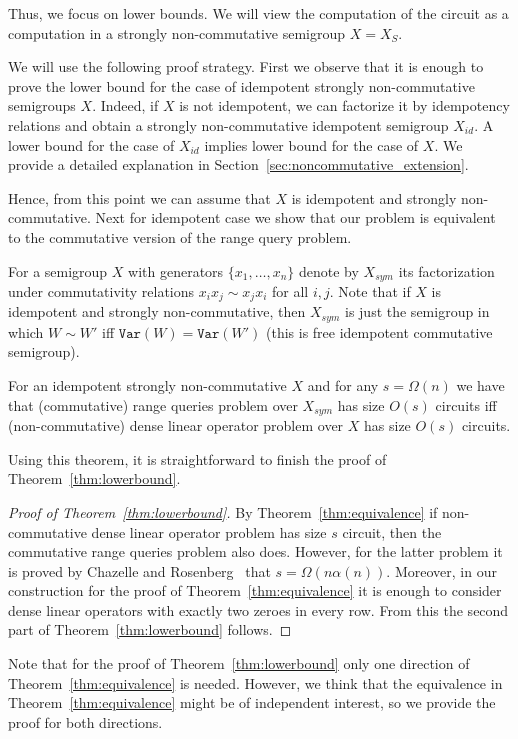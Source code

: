 \documentclass[review,onefignum,onetabnum]{siamart190516}
\newcommand{\var}{\texttt{Var}}
\begin{document}
Thus, we focus on lower bounds. We will view the computation of the circuit as a
computation in a strongly non-commutative semigroup $X=X_S$.

We will use the following proof strategy. First we observe that it is enough to
prove the lower bound for the case of idempotent strongly non-commutative
semigroups $X$. Indeed, if $X$ is not idempotent, we can factorize it by
idempotency relations and obtain a strongly non-commutative idempotent semigroup
$X_{id}$. A lower bound for the case of $X_{id}$ implies lower bound for the
case of $X$. We provide a detailed explanation in
Section~\ref{sec:noncommutative_extension}.

Hence, from this point we can assume that $X$ is idempotent and strongly
non-commutative. Next for idempotent case we show that our problem is equivalent
to the commutative version of the range query problem.

For a semigroup $X$ with generators $\{x_1,\ldots, x_n\}$ denote by $X_{sym}$
its factorization under commutativity relations
$x_i x_j \sim x_j x_i$ for all $i,j$. Note that if $X$ is idempotent and
strongly non-commutative, then $X_{sym}$ is just the semigroup in which
$W \sim W'$ iff $\var(W)=\var(W')$ (this is free idempotent commutative
semigroup).

\begin{theorem}\label{thm:equivalence}
For an idempotent strongly non-commutative $X$ and for any $s=\Omega(n)$ we have
that (commutative) range queries problem over $X_{sym}$ has size $O(s)$ circuits
iff (non-commutative) dense linear operator problem over $X$ has size $O(s)$
circuits.
\end{theorem}

Using this theorem, it is straightforward to finish the proof of
Theorem~\ref{thm:lowerbound}.
\begin{proof}[Proof of Theorem~\ref{thm:lowerbound}]
By Theorem~\ref{thm:equivalence} if non-commutative dense linear
operator problem has size $s$ circuit, then the commutative range queries
problem also does. However, for the latter problem it is proved by Chazelle and
Rosenberg~\cite{DBLP:journals/ijcga/ChazelleR91} that $s=\Omega(n \alpha(n))$.
Moreover, in our construction for the proof of Theorem~\ref{thm:equivalence} it
is enough to consider dense linear operators with exactly two zeroes in every
row. From this the second part of Theorem~\ref{thm:lowerbound} follows.
\end{proof}

Note that for the proof of Theorem~\ref{thm:lowerbound} only one direction of
Theorem~\ref{thm:equivalence} is needed. However, we think that the equivalence
in Theorem~\ref{thm:equivalence} might be of independent interest, so we provide
the proof for both directions.
\end{document}
